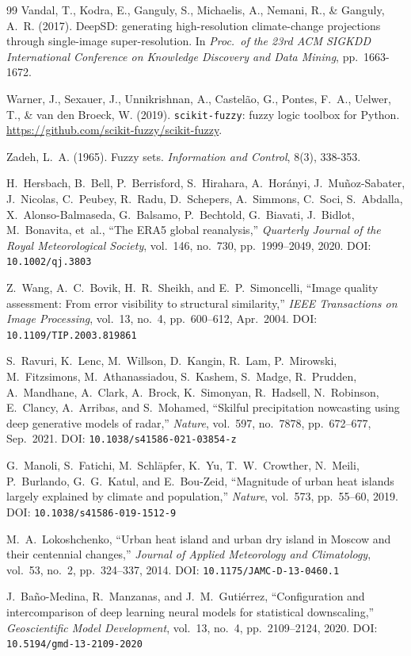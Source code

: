 \documentclass[conference]{IEEEtran}
\begin{document}
\begin{thebibliography}{99}
Vandal, T., Kodra, E., Ganguly, S., Michaelis, A., Nemani, R., \&
Ganguly, A.~R. (2017).
\newblock DeepSD: generating high-resolution climate-change projections
through single-image super-resolution.
\newblock In \textit{Proc.\ of the 23rd ACM SIGKDD International
Conference on Knowledge Discovery and Data Mining}, pp.\ 1663-1672.

Warner, J., Sexauer, J., Unnikrishnan, A., Castelão, G., Pontes, F.~A.,
Uelwer, T., \& van den Broeck, W. (2019).
\newblock \texttt{scikit-fuzzy}: fuzzy logic toolbox for Python.
\newblock \url{https://github.com/scikit-fuzzy/scikit-fuzzy}.

Zadeh, L.~A. (1965).
\newblock Fuzzy sets.
\newblock \textit{Information and Control}, 8(3), 338-353.

H.~Hersbach, B.~Bell, P.~Berrisford, S.~Hirahara, A.~Hor\'{a}nyi,
J.~Mu\~{n}oz-Sabater, J.~Nicolas, C.~Peubey, R.~Radu, D.~Schepers,
A.~Simmons, C.~Soci, S.~Abdalla, X.~Alonso-Balmaseda, G.~Balsamo,
P.~Bechtold, G.~Biavati, J.~Bidlot, M.~Bonavita, et~al.,
``The {ERA5} global reanalysis,''
\textit{Quarterly Journal of the Royal Meteorological Society},
vol.~146, no.~730, pp.~1999--2049, 2020.
DOI: \texttt{10.1002/qj.3803}

Z.~Wang, A.~C.~Bovik, H.~R.~Sheikh, and E.~P.~Simoncelli,
``Image quality assessment: From error visibility to structural similarity,''
\textit{IEEE Transactions on Image Processing},
vol.~13, no.~4, pp.~600--612, Apr.\ 2004.
DOI: \texttt{10.1109/TIP.2003.819861}

S.~Ravuri, K.~Lenc, M.~Willson, D.~Kangin, R.~Lam, P.~Mirowski,
M.~Fitzsimons, M.~Athanassiadou, S.~Kashem, S.~Madge, R.~Prudden,
A.~Mandhane, A.~Clark, A.~Brock, K.~Simonyan, R.~Hadsell,
N.~Robinson, E.~Clancy, A.~Arribas, and S.~Mohamed,
``Skilful precipitation nowcasting using deep generative models of radar,''
\textit{Nature},
vol.~597, no.~7878, pp.~672--677, Sep.\ 2021.
DOI: \texttt{10.1038/s41586-021-03854-z}

G.~Manoli, S.~Fatichi, M.~Schl\"{a}pfer, K.~Yu, T.~W.~Crowther,
N.~Meili, P.~Burlando, G.~G.~Katul, and E.~Bou-Zeid,
``Magnitude of urban heat islands largely explained by climate and population,''
\textit{Nature},
vol.~573, pp.~55--60, 2019.
DOI: \texttt{10.1038/s41586-019-1512-9}

M.~A.~Lokoshchenko,
``Urban heat island and urban dry island in {Moscow} and their centennial changes,''
\textit{Journal of Applied Meteorology and Climatology},
vol.~53, no.~2, pp.~324--337, 2014.
DOI: \texttt{10.1175/JAMC-D-13-0460.1}

J.~Ba\~{n}o-Medina, R.~Manzanas, and J.~M.~Guti\'{e}rrez,
``Configuration and intercomparison of deep learning neural models for statistical downscaling,''
\textit{Geoscientific Model Development},
vol.~13, no.~4, pp.~2109--2124, 2020.
DOI: \texttt{10.5194/gmd-13-2109-2020}
\end{thebibliography}
\end{document}
